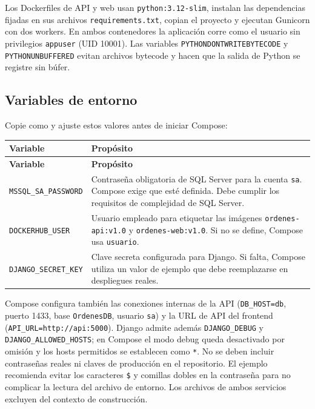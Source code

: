 \documentclass[11pt,a4paper]{article}
\newcommand{\codigo}[1]{\texttt{\detokenize{#1}}}
\begin{document}
Los Dockerfiles de API y web usan \texttt{python:3.12-slim}, instalan las dependencias fijadas en sus archivos \texttt{requirements.txt}, copian el proyecto y ejecutan Gunicorn con dos workers. En ambos contenedores la aplicación corre como el usuario sin privilegios \texttt{appuser} (UID 10001). Las variables \texttt{PYTHONDONTWRITEBYTECODE} y \texttt{PYTHONUNBUFFERED} evitan archivos bytecode y hacen que la salida de Python se registre sin búfer.

\subsection{Variables de entorno}
Copie \codigo{.env.example} como \codigo{.env} y ajuste estos valores antes de iniciar Compose:

\begin{longtable}{>{\raggedright\arraybackslash}p{} >{\raggedright\arraybackslash}p{}}
\toprule
\textbf{Variable} & \textbf{Propósito}\\
\midrule
\endfirsthead
\toprule
\textbf{Variable} & \textbf{Propósito}\\
\midrule
\endhead
\texttt{MSSQL\_SA\_PASSWORD} & Contraseña obligatoria de SQL Server para la cuenta \texttt{sa}. Compose exige que esté definida. Debe cumplir los requisitos de complejidad de SQL Server.\\
\texttt{DOCKERHUB\_USER} & Usuario empleado para etiquetar las imágenes \texttt{ordenes-api:v1.0} y \texttt{ordenes-web:v1.0}. Si no se define, Compose usa \texttt{usuario}.\\
\texttt{DJANGO\_SECRET\_KEY} & Clave secreta configurada para Django. Si falta, Compose utiliza un valor de ejemplo que debe reemplazarse en despliegues reales.\\
\bottomrule
\end{longtable}

Compose configura también las conexiones internas de la API (\texttt{DB\_HOST=db}, puerto 1433, base \texttt{OrdenesDB}, usuario \texttt{sa}) y la URL de API del frontend (\texttt{API\_URL=http://api:5000}). Django admite además \texttt{DJANGO\_DEBUG} y \texttt{DJANGO\_ALLOWED\_HOSTS}; en Compose el modo debug queda desactivado por omisión y los hosts permitidos se establecen como \texttt{*}. No se deben incluir contraseñas reales ni claves de producción en el repositorio. El ejemplo recomienda evitar los caracteres \texttt{\$} y comillas dobles en la contraseña para no complicar la lectura del archivo de entorno. Los archivos \codigo{.dockerignore} de ambos servicios excluyen \codigo{.env} del contexto de construcción.
\end{document}
